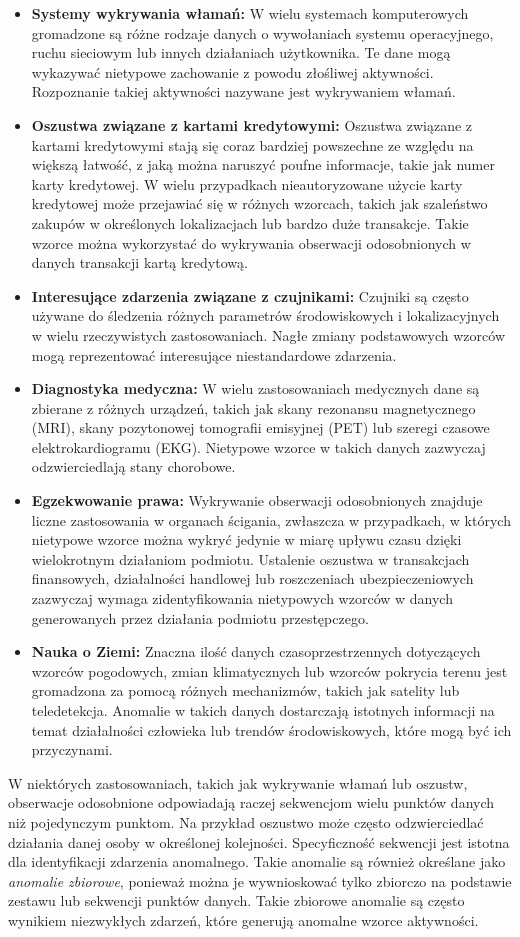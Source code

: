 \documentclass[12pt,a4paper,oneside]{book}
\theoremstyle{definition}
\begin{document}
\begin{itemize}
	\item \textbf{Systemy wykrywania włamań:} W wielu systemach komputerowych gromadzone są różne rodzaje danych o wywołaniach systemu operacyjnego, ruchu sieciowym lub innych działaniach użytkownika. Te dane mogą wykazywać nietypowe zachowanie z powodu złośliwej aktywności. Rozpoznanie takiej aktywności nazywane jest wykrywaniem włamań.
	\item \textbf{Oszustwa związane z kartami kredytowymi:} Oszustwa związane z kartami kredytowymi stają się coraz bardziej powszechne ze względu na większą łatwość, z jaką można naruszyć poufne informacje, takie jak numer karty kredytowej. W wielu przypadkach nieautoryzowane użycie karty kredytowej może przejawiać się w różnych wzorcach, takich jak szaleństwo zakupów w określonych lokalizacjach lub bardzo duże transakcje. Takie wzorce można wykorzystać do wykrywania obserwacji odosobnionych w danych transakcji kartą kredytową.
	\item \textbf{Interesujące zdarzenia związane z czujnikami:} Czujniki są często używane do śledzenia różnych parametrów środowiskowych i lokalizacyjnych w wielu rzeczywistych zastosowaniach. Nagłe zmiany podstawowych wzorców mogą reprezentować interesujące niestandardowe zdarzenia.
	\item \textbf{Diagnostyka medyczna:} W wielu zastosowaniach medycznych dane są zbierane z różnych urządzeń, takich jak skany rezonansu magnetycznego (MRI), skany pozytonowej tomografii emisyjnej (PET) lub szeregi czasowe elektrokardiogramu (EKG). Nietypowe wzorce w takich danych zazwyczaj odzwierciedlają stany chorobowe.
	\item \textbf{Egzekwowanie prawa:} Wykrywanie obserwacji odosobnionych znajduje liczne zastosowania w organach ścigania, zwłaszcza w przypadkach, w których nietypowe wzorce można wykryć jedynie w miarę upływu czasu dzięki wielokrotnym działaniom podmiotu. Ustalenie oszustwa w transakcjach finansowych, działalności handlowej lub roszczeniach ubezpieczeniowych zazwyczaj wymaga zidentyfikowania nietypowych wzorców w danych generowanych przez działania podmiotu przestępczego.
	\item \textbf{Nauka o Ziemi:} Znaczna ilość danych czasoprzestrzennych dotyczących wzorców pogodowych, zmian klimatycznych lub wzorców pokrycia terenu jest gromadzona za pomocą różnych mechanizmów, takich jak satelity lub teledetekcja. Anomalie w takich danych dostarczają istotnych informacji na temat działalności człowieka lub trendów środowiskowych, które mogą być ich przyczynami.
\end{itemize}
W niektórych zastosowaniach, takich jak wykrywanie włamań lub oszustw, obserwacje odosobnione odpowiadają raczej sekwencjom wielu punktów danych niż pojedynczym punktom. Na przykład oszustwo może często odzwierciedlać działania danej osoby w określonej kolejności. Specyficzność sekwencji jest istotna dla identyfikacji zdarzenia anomalnego. Takie anomalie są również określane jako \textit{anomalie zbiorowe}, ponieważ można je wywnioskować tylko zbiorczo na podstawie zestawu lub sekwencji punktów danych. Takie zbiorowe anomalie są często wynikiem niezwykłych zdarzeń, które generują anomalne wzorce aktywności.
\end{document}

